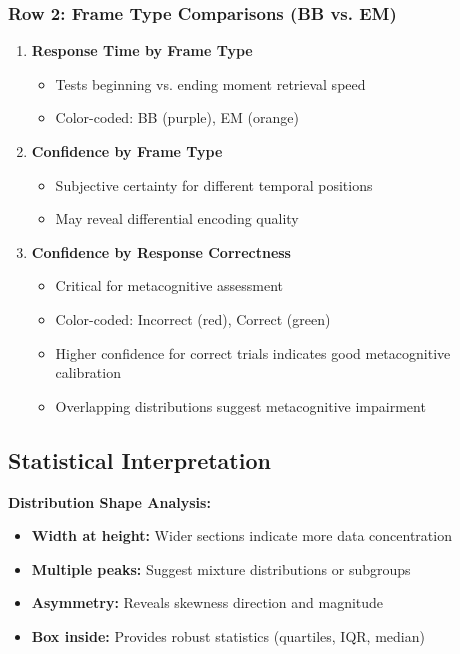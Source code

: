 \documentclass[12pt,a4paper]{article}
\begin{document}
\subsubsection{Row 2: Frame Type Comparisons (BB vs. EM)}
\begin{enumerate}
    \item \textbf{Response Time by Frame Type}
        \begin{itemize}
            \item Tests beginning vs. ending moment retrieval speed
            \item Color-coded: BB (purple), EM (orange)
        \end{itemize}
    
    \item \textbf{Confidence by Frame Type}
        \begin{itemize}
            \item Subjective certainty for different temporal positions
            \item May reveal differential encoding quality
        \end{itemize}
    
    \item \textbf{Confidence by Response Correctness}
        \begin{itemize}
            \item Critical for metacognitive assessment
            \item Color-coded: Incorrect (red), Correct (green)
            \item Higher confidence for correct trials indicates good metacognitive calibration
            \item Overlapping distributions suggest metacognitive impairment
        \end{itemize}
\end{enumerate}

\subsection{Statistical Interpretation}

\textbf{Distribution Shape Analysis:}
\begin{itemize}
    \item \textbf{Width at height:} Wider sections indicate more data concentration
    \item \textbf{Multiple peaks:} Suggest mixture distributions or subgroups
    \item \textbf{Asymmetry:} Reveals skewness direction and magnitude
    \item \textbf{Box inside:} Provides robust statistics (quartiles, IQR, median)
\end{itemize}
\end{document}
